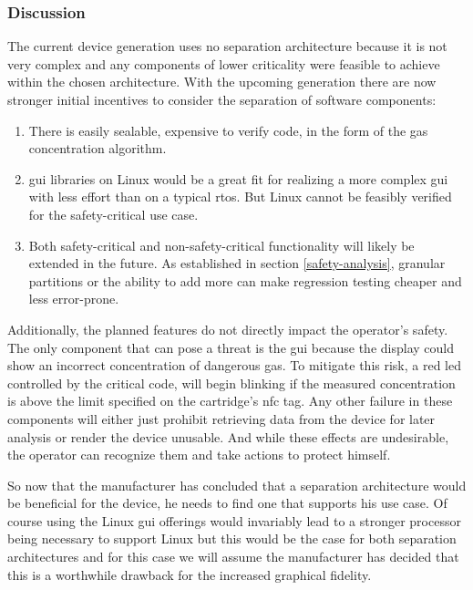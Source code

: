 \subsubsection{Discussion}
The current device generation uses no separation architecture because it is not very complex and any components of lower criticality were feasible to achieve within the chosen architecture. With the upcoming generation there are now stronger initial incentives to consider the separation of software components:
\begin{enumerate}
\item There is easily sealable, expensive to verify code, in the form of the gas concentration algorithm.
\item \acrshort{gui} libraries on Linux would be a great fit for realizing a more complex \acrshort{gui} with less effort than on a typical \acrshort{rtos}. But Linux cannot be feasibly verified for the safety-critical use case.
\item Both safety-critical and non-safety-critical functionality will likely be extended in the future. As established in section  \ref{safety-analysis}, granular partitions or the ability to add more can make regression testing cheaper and less error-prone.
\end{enumerate}
Additionally, the planned features do not directly impact the operator's safety. The only component that can pose a threat is the \acrshort{gui} because the display could show an incorrect concentration of dangerous gas. To mitigate this risk, a red \acrshort{led} controlled by the critical code, will begin blinking if the measured concentration is above the limit specified on the cartridge's \acrshort{nfc} tag. Any other failure in these components will either just prohibit retrieving data from the device for later analysis or render the device unusable. And while these effects are undesirable, the operator can recognize them and take actions to protect himself.

So now that the manufacturer has concluded that a separation architecture would be beneficial for the device, he needs to find one that supports his use case.  Of course using the Linux \acrshort{gui} offerings would invariably lead to a stronger processor being necessary to support Linux but this would be the case for both separation architectures and for this case we will assume the manufacturer has decided that this is a worthwhile drawback for the increased graphical fidelity. 

